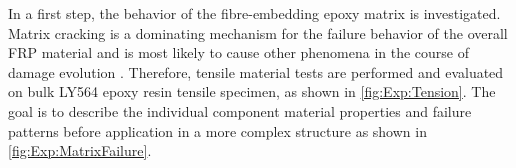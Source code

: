 
In a first step, the behavior of the fibre-embedding epoxy matrix is investigated. Matrix cracking is a dominating mechanism for the failure behavior of the overall FRP material and is most likely to cause other phenomena in the course of damage evolution \cite{KrauseD2016}. Therefore, tensile material tests are performed and evaluated on bulk LY564 epoxy resin tensile specimen, as shown in \autoref{fig:Exp:Tension}. The goal is to describe the individual component material properties and failure patterns before application in a more complex structure as shown in \autoref{fig:Exp:MatrixFailure}.

